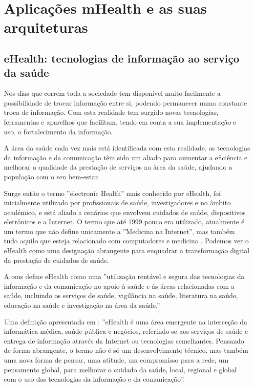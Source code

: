 \chapter{Aplica\c c\~oes mHealth e as suas arquiteturas}

\section{eHealth: tecnologias de informação ao serviço da saúde}

Nos dias que correm toda a sociedade tem dispon\'ivel muito facilmente a possibilidade de trocar informa\c c\~ao entre si, podendo permanecer numa constante troca de informa\c c\~ao.  Com esta realidade tem surgido novas tecnologias, ferramentas e aparelhos que facilitam, tendo em conta a sua implementa\c c\~ao e uso, o fortalecimento da informa\c c\~ao. 
\par
A \'area da sa\'ude cada vez mais est\'a identificada com esta realidade, as tecnologias da informa\c c\~ao e da comunica\c c\~ao t\^em sido um aliado para aumentar a efici\^encia e melhorar a qualidade da presta\c c\~ao de servi\c cos na \`area da sa\'ude, ajudando a popula\c c\~ao com o seu bem-estar. 
\par
Surge então o termo ''electronic Health'' mais conhecido por eHealth, foi inicialmente utilizado por profissionais de sa\'ude, investigadores e no \^ambito acad\'emico, e est\'a aliado a cen\'arios que envolvem cuidados de sa\'ude, dispositivos eletr\'onicos e a Internet. O termo que at\'e 1999 pouco era utilizado, atualmente \'e um termo que n\~ao define unicamente a ''Medicina na Internet'', mas tamb\'em tudo aquilo que esteja relacionado com computadores e medicina \cite{ehealth}. Podemos ver o eHealth como uma designação abrangente para enquadrar a transformação digital da prestação de cuidados de saúde.
\par A \gls{oms} define eHealth \cite{ehealth_oms} como uma ''utiliza\c c\~ao rent\'avel e segura das tecnologias da informa\c c\~ao e da comunica\c c\~ao no apoio \`a sa\'ude e \`as \'areas relacionadas com a sa\'ude, incluindo os servi\c cos de sa\'ude, vigil\^ancia na sa\'ude, literatura na sa\'ude, educa\c c\~ao na sa\'ude e investiga\c c\~ao na \'area da sa\'ude.''
\par
Uma defini\c c\~ao apresentada em \cite{ehealth}: ''eHealth \'e uma \'area emergente na interce\c c\~ao da inform\'atica m\'edica, sa\'ude p\'ublica e neg\'ocios, referindo-se aos servi\c cos de sa\'ude e entrega de informa\c c\~ao atrav\'es da Internet ou tecnologias semelhantes. Pensando de forma abrangente, o termo n\~ao \'e s\'o um desenvolvimento t\'ecnico, mas tamb\'em uma nova forma de pensar, uma atitude, um compromisso para a rede, um pensamento global, para melhorar o cuidado da sa\'ude, local, regional e global com o uso das tecnologias da informa\c c\~ao e da comunica\c c\~ao''.
